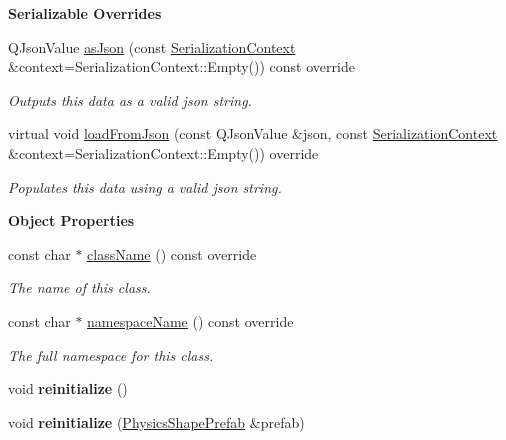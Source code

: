 \begin{Indent}\textbf{ Serializable Overrides}\par
\begin{DoxyCompactItemize}
\item 
\mbox{\label{classrev_1_1_rigid_body_ad7f161c6f63667b0cd5532ed023011ab}} 
Q\+Json\+Value \mbox{\hyperlink{classrev_1_1_rigid_body_ad7f161c6f63667b0cd5532ed023011ab}{as\+Json}} (const \mbox{\hyperlink{structrev_1_1_serialization_context}{Serialization\+Context}} \&context=Serialization\+Context\+::\+Empty()) const override
\begin{DoxyCompactList}\small\item\em Outputs this data as a valid json string. \end{DoxyCompactList}\item 
\mbox{\label{classrev_1_1_rigid_body_af00e0ad66c49d83e81cceb008793cac3}} 
virtual void \mbox{\hyperlink{classrev_1_1_rigid_body_af00e0ad66c49d83e81cceb008793cac3}{load\+From\+Json}} (const Q\+Json\+Value \&json, const \mbox{\hyperlink{structrev_1_1_serialization_context}{Serialization\+Context}} \&context=Serialization\+Context\+::\+Empty()) override
\begin{DoxyCompactList}\small\item\em Populates this data using a valid json string. \end{DoxyCompactList}\end{DoxyCompactItemize}
\end{Indent}
\begin{Indent}\textbf{ Object Properties}\par
\begin{DoxyCompactItemize}
\item 
const char $\ast$ \mbox{\hyperlink{classrev_1_1_rigid_body_a996230070162f743c3e87f5c20fd981e}{class\+Name}} () const override
\begin{DoxyCompactList}\small\item\em The name of this class. \end{DoxyCompactList}\item 
const char $\ast$ \mbox{\hyperlink{classrev_1_1_rigid_body_ae8e178b51dbe0e61ad0674e039864a92}{namespace\+Name}} () const override
\begin{DoxyCompactList}\small\item\em The full namespace for this class. \end{DoxyCompactList}\item 
\mbox{\label{classrev_1_1_rigid_body_acad7e704b6e234d947dbdf9528bf2a8a}} 
void {\bfseries reinitialize} ()
\item 
\mbox{\label{classrev_1_1_rigid_body_ae3b3fabe43cb8a3b8b96bb0b9a410ff4}} 
void {\bfseries reinitialize} (\mbox{\hyperlink{classrev_1_1_physics_shape_prefab}{Physics\+Shape\+Prefab}} \&prefab)
\end{DoxyCompactItemize}
\end{Indent}
